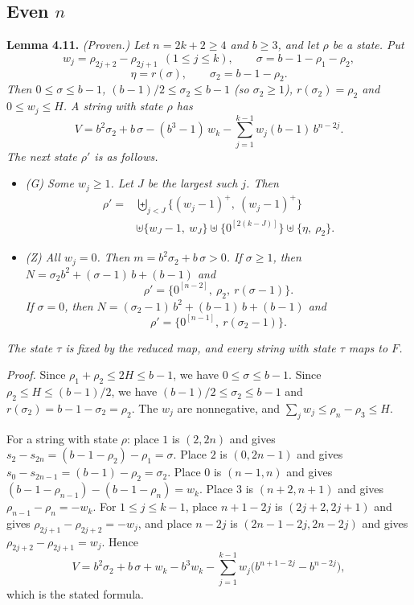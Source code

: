 \documentclass[11pt,letterpaper]{article}
\providecommand{\tightlist}{%
  \setlength{\itemsep}{0pt}\setlength{\parskip}{0pt}}
\theoremstyle{paperstyle}
\theoremstyle{paperstyledef}
\theoremstyle{paperstylerem}
\begin{document}
\subsection{\texorpdfstring{Even \(n\)}{Even n}}\label{even-n}

\textbf{Lemma 4.11.} \emph{(Proven.) Let \(n = 2k+2 \geq 4\) and \(b \geq 3\), and let \(\rho\) be a state. Put} \[w_j = \rho_{2j+2} - \rho_{2j+1} \ \ (1 \leq j \leq k), \qquad \sigma = b - 1 - \rho_1 - \rho_2,\] \[\eta = r(\sigma), \qquad \sigma_2 = b - 1 - \rho_2.\] \emph{Then \(0 \leq \sigma \leq b-1\), \((b-1)/2 \leq \sigma_2 \leq b-1\) (so \(\sigma_2 \geq 1\)), \(r(\sigma_2) = \rho_2\) and \(0 \leq w_j \leq H\). A string with state \(\rho\) has} \[V = b^2 \sigma_2 + b\,\sigma - (b^3 - 1)\, w_k - \sum_{j=1}^{k-1} w_j (b-1)\, b^{n-2j}.\] \emph{The next state \(\rho'\) is as follows.}

\begin{itemize}
\tightlist
\item
  \emph{(G) Some \(w_j \geq 1\). Let \(J\) be the largest such \(j\). Then} \[\begin{aligned}\rho' = {} & \biguplus_{j<J} \{(w_j - 1)^+,\ (w_j - 1)^+\} \\ & \uplus \{w_J - 1,\ w_J\} \uplus \{0^{[2(k-J)]}\} \uplus \{\eta,\ \rho_2\}.\end{aligned}\]
\item
  \emph{(Z) All \(w_j = 0\). Then \(m = b^2 \sigma_2 + b\,\sigma > 0\). If \(\sigma \geq 1\), then \(N = \sigma_2 b^2 + (\sigma - 1)\, b + (b-1)\) and} \[\rho' = \{0^{[n-2]},\ \rho_2,\ r(\sigma - 1)\}.\] \emph{If \(\sigma = 0\), then \(N = (\sigma_2 - 1)\, b^2 + (b-1)\, b + (b-1)\) and} \[\rho' = \{0^{[n-1]},\ r(\sigma_2 - 1)\}.\]
\end{itemize}

\emph{The state \(\tau\) is fixed by the reduced map, and every string with state \(\tau\) maps to \(F\).}

\emph{Proof.} Since \(\rho_1 + \rho_2 \leq 2H \leq b-1\), we have \(0 \leq \sigma \leq b-1\). Since \(\rho_2 \leq H \leq (b-1)/2\), we have \((b-1)/2 \leq \sigma_2 \leq b-1\) and \(r(\sigma_2) = b-1-\sigma_2 = \rho_2\). The \(w_j\) are nonnegative, and \(\sum_j w_j \leq \rho_n - \rho_3 \leq H\).

For a string with state \(\rho\): place \(1\) is \((2, 2n)\) and gives \(s_2 - s_{2n} = (b-1-\rho_2) - \rho_1 = \sigma\). Place \(2\) is \((0, 2n-1)\) and gives \(s_0 - s_{2n-1} = (b-1) - \rho_2 = \sigma_2\). Place \(0\) is \((n-1, n)\) and gives \((b-1-\rho_{n-1}) - (b-1-\rho_n) = w_k\). Place \(3\) is \((n+2, n+1)\) and gives \(\rho_{n-1} - \rho_n = -w_k\). For \(1 \leq j \leq k-1\), place \(n+1-2j\) is \((2j+2, 2j+1)\) and gives \(\rho_{2j+1} - \rho_{2j+2} = -w_j\), and place \(n-2j\) is \((2n-1-2j, 2n-2j)\) and gives \(\rho_{2j+2} - \rho_{2j+1} = w_j\). Hence \[V = b^2 \sigma_2 + b\,\sigma + w_k - b^3 w_k - \sum_{j=1}^{k-1} w_j \bigl(b^{n+1-2j} - b^{n-2j}\bigr),\] which is the stated formula.
\end{document}
